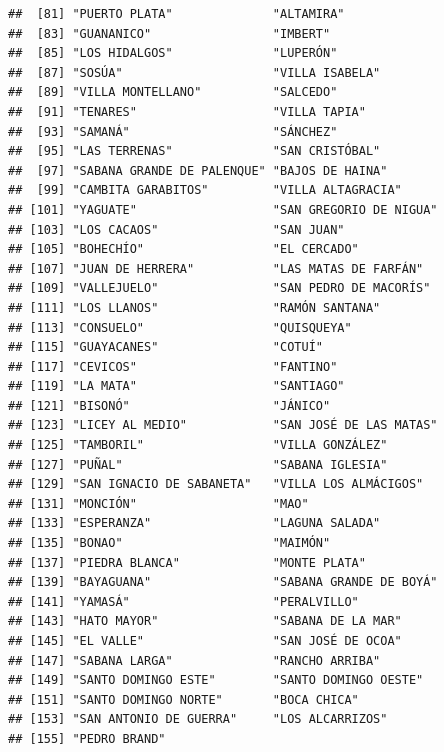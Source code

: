 \documentclass[11pt,]{article}
\newenvironment{Shaded}{\begin{snugshade}}{\end{snugshade}}
\newcommand{\OperatorTok}[1]{\textcolor[rgb]{0.81,0.36,0.00}{\textbf{#1}}}
\newcommand{\NormalTok}[1]{#1}
\begin{document}
\begin{verbatim}
##  [81] "PUERTO PLATA"              "ALTAMIRA"                 
##  [83] "GUANANICO"                 "IMBERT"                   
##  [85] "LOS HIDALGOS"              "LUPERÓN"                  
##  [87] "SOSÚA"                     "VILLA ISABELA"            
##  [89] "VILLA MONTELLANO"          "SALCEDO"                  
##  [91] "TENARES"                   "VILLA TAPIA"              
##  [93] "SAMANÁ"                    "SÁNCHEZ"                  
##  [95] "LAS TERRENAS"              "SAN CRISTÓBAL"            
##  [97] "SABANA GRANDE DE PALENQUE" "BAJOS DE HAINA"           
##  [99] "CAMBITA GARABITOS"         "VILLA ALTAGRACIA"         
## [101] "YAGUATE"                   "SAN GREGORIO DE NIGUA"    
## [103] "LOS CACAOS"                "SAN JUAN"                 
## [105] "BOHECHÍO"                  "EL CERCADO"               
## [107] "JUAN DE HERRERA"           "LAS MATAS DE FARFÁN"      
## [109] "VALLEJUELO"                "SAN PEDRO DE MACORÍS"     
## [111] "LOS LLANOS"                "RAMÓN SANTANA"            
## [113] "CONSUELO"                  "QUISQUEYA"                
## [115] "GUAYACANES"                "COTUÍ"                    
## [117] "CEVICOS"                   "FANTINO"                  
## [119] "LA MATA"                   "SANTIAGO"                 
## [121] "BISONÓ"                    "JÁNICO"                   
## [123] "LICEY AL MEDIO"            "SAN JOSÉ DE LAS MATAS"    
## [125] "TAMBORIL"                  "VILLA GONZÁLEZ"           
## [127] "PUÑAL"                     "SABANA IGLESIA"           
## [129] "SAN IGNACIO DE SABANETA"   "VILLA LOS ALMÁCIGOS"      
## [131] "MONCIÓN"                   "MAO"                      
## [133] "ESPERANZA"                 "LAGUNA SALADA"            
## [135] "BONAO"                     "MAIMÓN"                   
## [137] "PIEDRA BLANCA"             "MONTE PLATA"              
## [139] "BAYAGUANA"                 "SABANA GRANDE DE BOYÁ"    
## [141] "YAMASÁ"                    "PERALVILLO"               
## [143] "HATO MAYOR"                "SABANA DE LA MAR"         
## [145] "EL VALLE"                  "SAN JOSÉ DE OCOA"         
## [147] "SABANA LARGA"              "RANCHO ARRIBA"            
## [149] "SANTO DOMINGO ESTE"        "SANTO DOMINGO OESTE"      
## [151] "SANTO DOMINGO NORTE"       "BOCA CHICA"               
## [153] "SAN ANTONIO DE GUERRA"     "LOS ALCARRIZOS"           
## [155] "PEDRO BRAND"
\end{verbatim}

\begin{Shaded}
\end{Shaded}
\end{document}
